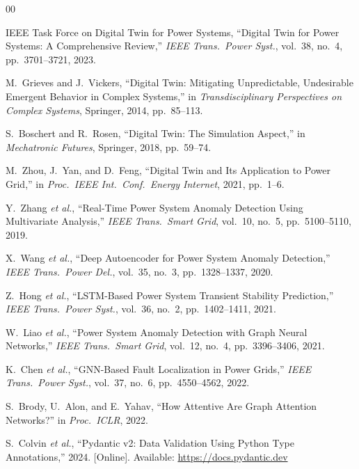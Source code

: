 \documentclass[conference]{IEEEtran}
\begin{document}

\begin{thebibliography}{00}

IEEE Task Force on Digital Twin for Power Systems, ``Digital Twin for Power Systems: A Comprehensive Review,'' \textit{IEEE Trans.\ Power Syst.}, vol.~38, no.~4, pp.~3701--3721, 2023.

M.~Grieves and J.~Vickers, ``Digital Twin: Mitigating Unpredictable, Undesirable Emergent Behavior in Complex Systems,'' in \textit{Transdisciplinary Perspectives on Complex Systems}, Springer, 2014, pp.~85--113.

S.~Boschert and R.~Rosen, ``Digital Twin: The Simulation Aspect,'' in \textit{Mechatronic Futures}, Springer, 2018, pp.~59--74.

M.~Zhou, J.~Yan, and D.~Feng, ``Digital Twin and Its Application to Power Grid,'' in \textit{Proc.\ IEEE Int.\ Conf.\ Energy Internet}, 2021, pp.~1--6.

Y.~Zhang \textit{et al.}, ``Real-Time Power System Anomaly Detection Using Multivariate Analysis,'' \textit{IEEE Trans.\ Smart Grid}, vol.~10, no.~5, pp.~5100--5110, 2019.

X.~Wang \textit{et al.}, ``Deep Autoencoder for Power System Anomaly Detection,'' \textit{IEEE Trans.\ Power Del.}, vol.~35, no.~3, pp.~1328--1337, 2020.

Z.~Hong \textit{et al.}, ``LSTM-Based Power System Transient Stability Prediction,'' \textit{IEEE Trans.\ Power Syst.}, vol.~36, no.~2, pp.~1402--1411, 2021.

W.~Liao \textit{et al.}, ``Power System Anomaly Detection with Graph Neural Networks,'' \textit{IEEE Trans.\ Smart Grid}, vol.~12, no.~4, pp.~3396--3406, 2021.

K.~Chen \textit{et al.}, ``GNN-Based Fault Localization in Power Grids,'' \textit{IEEE Trans.\ Power Syst.}, vol.~37, no.~6, pp.~4550--4562, 2022.

S.~Brody, U.~Alon, and E.~Yahav, ``How Attentive Are Graph Attention Networks?'' in \textit{Proc.\ ICLR}, 2022.

S.~Colvin \textit{et al.}, ``Pydantic v2: Data Validation Using Python Type Annotations,'' 2024. [Online]. Available: \url{https://docs.pydantic.dev}


\end{thebibliography}
\end{document}
